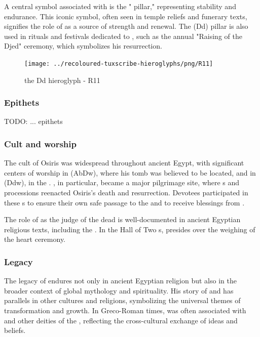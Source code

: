 A central symbol associated with  is the " pillar," representing stability and endurance. This iconic symbol, often seen in temple reliefs and funerary texts, signifies the role of  as a source of strength and renewal. The  (Dd) pillar is also used in rituals and festivals dedicated to , such as the annual "Raising of the Djed" ceremony, which symbolizes his resurrection.

\begin{figure} [H]
	\centering
	\texttt{[image: ../recoloured-tuxscribe-hieroglyphs/png/R11]}
	\caption{the Dd hieroglyph - R11}
\end{figure}

\subsubsection*{Epithets}

TODO: ... epithets

\subsubsection*{Cult and worship}

The cult of Osiris was widespread throughout ancient Egypt, with significant centers of worship in  (AbDw), where his tomb was believed to be located, and in  (Ddw), in the  . , in particular, became a major pilgrimage site, where s and processions reenacted Osiris's death and resurrection. Devotees participated in these s to ensure their own safe passage to the  and to receive blessings from .

The role of  as the judge of the dead is well-documented in ancient Egyptian religious texts, including the . In the Hall of Two s,  presides over the weighing of the heart ceremony.

\subsubsection*{Legacy}

The legacy of  endures not only in ancient Egyptian religion but also in the broader context of global mythology and spirituality. His story of  and  has parallels in other cultures and religions, symbolizing the universal themes of transformation and growth. In Greco-Roman times,  was often associated with  and other deities of the , reflecting the cross-cultural exchange of ideas and beliefs.


